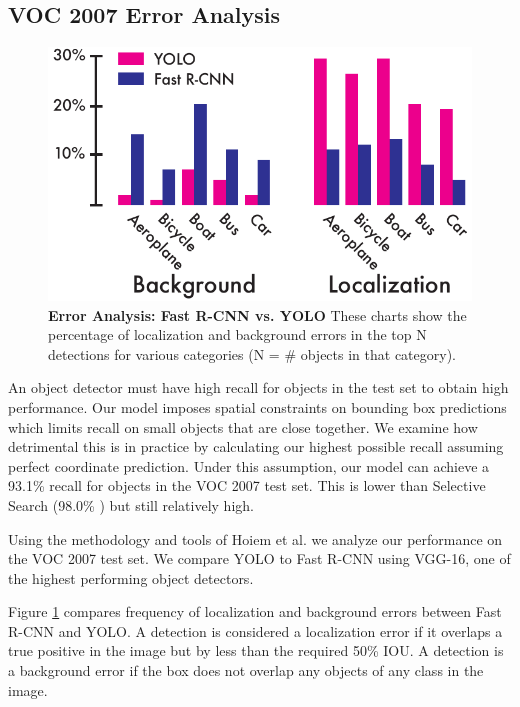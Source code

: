 \documentclass{article} %
\begin{document}
\subsection{VOC 2007 Error Analysis}
\label{error}

\begin{figure}
      \centering
        \includegraphics[width=\linewidth]{errors}
      \caption{\small \textbf{Error Analysis: Fast R-CNN vs. YOLO} These charts show the percentage of localization and background errors in the top N detections for various categories (N = \# objects in that category).}
      \label{errors}
   \end{figure}

An object detector must have high recall for objects in the test set to obtain high performance. Our model imposes spatial constraints on bounding box predictions which limits recall on small objects that are close together. We examine how detrimental this is in practice by calculating our highest possible recall assuming perfect coordinate prediction. Under this assumption, our model can achieve a 93.1\% recall for objects in the VOC 2007 test set. This is lower than Selective Search (98.0\% \cite{uijlings2013selective}) but still relatively high.

Using the methodology and tools of Hoiem et al. \cite{hoiem2012diagnosing} we analyze our performance on the VOC 2007 test set. We compare YOLO to Fast R-CNN using VGG-16, one of the highest performing object detectors.

Figure \ref{errors} compares frequency of localization and background errors between Fast R-CNN and YOLO. A detection is considered a localization error if it overlaps a true positive in the image but by less than the required 50\% IOU. A detection is a background error if the box does not overlap any objects of any class in the image.
\end{document}
